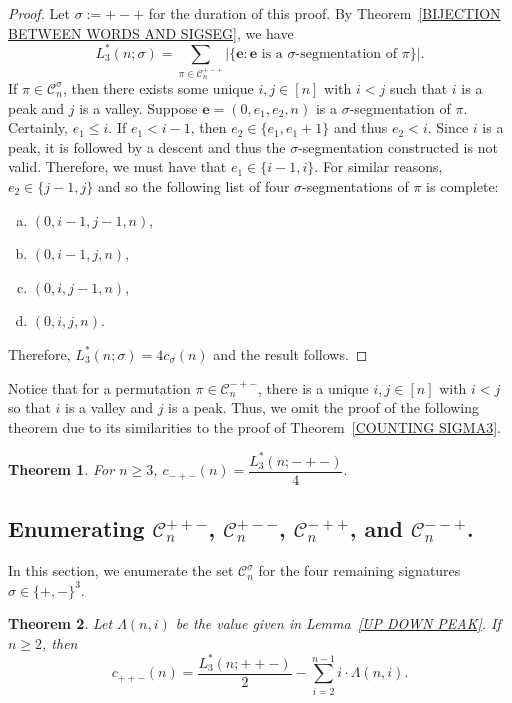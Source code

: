 \documentclass[12pt]{article}
\newcommand{\C}{\mathcal{C}}
\newcommand{\e}{\mathbf{e}}
\theoremstyle{plain}
\newtheorem{theorem}{Theorem}
\theoremstyle{definition}
\begin{document}
\begin{proof} Let $\sigma:=+-+$ for the duration of this proof.
By Theorem~\ref{BIJECTION BETWEEN WORDS AND SIGSEG}, we have
	\[L_3^*(n;\sigma)= \sum_{\pi \in \mathcal C_n^{+-+}} |\{\e: \e \text{ is a }\sigma\text{-segmentation of } \pi\}|.\]
If $\pi \in \mathcal C_n^{\sigma}$, then there exists some unique $i,j \in [n]$ with $i<j$ such that $i$ is a peak and $j$ is a valley.  Suppose $\e=(0, e_1, e_2, n)$ is a $\sigma$-segmentation of $\pi$. Certainly, $e_1\leq i$.  If $e_1<i-1$, then $e_2 \in \{e_1,e_1+1\}$ and thus $e_2<i$.  Since $i$ is a peak, it is followed by a descent and thus the $\sigma$-segmentation constructed is not valid. Therefore, we must have that $e_1\in\{i-1,i\}$. For similar reasons, $e_2 \in \{j-1,j\}$ and so the following list of four $\sigma$-segmentations of $\pi$ is complete:
	\begin{enumerate}[(a)]
		\item $(0, i-1, j-1, n)$,
		\item $(0, i-1, j, n)$,
		\item $(0, i, j-1, n)$,
		\item $(0, i, j, n)$.
	\end{enumerate} 
  Therefore, $L_3^*(n;\sigma)=4c_{\sigma}(n)$ and the result follows.
\end{proof}

Notice that for a permutation $\pi\in\C_n^{-+-}$, there is a unique $i,j \in [n]$ with $i<j$ so that $i$ is a valley and $j$ is a peak. 
Thus, we omit the proof of the following theorem due to its similarities to the proof of Theorem~\ref{COUNTING SIGMA3}.

\begin{theorem}\label{COUNTING SIGMA4}
For $n \geq 3$, $c_{-+-}(n)=\dfrac{L_3^*(n;-+-)}{4}.$
\end{theorem}




\subsection{Enumerating $\C_n^{++-}$, $\C_n^{+--}$, $\C_n^{-++}$, and $\C_n^{--+}$.}\label{SECTION 5678}


In this section, we enumerate the set $\mathcal C_n^{\sigma}$ for the four remaining signatures $\sigma\in\{+,-\}^3$. 
\begin{theorem}\label{COUNT SIGMA5}
Let $\Lambda(n,i)$ be the value given in Lemma~\ref{UP DOWN PEAK}. If $n\geq 2$, then
	\[c_{++-}(n)=\frac{L^*_3(n;++-)}{2}-\sum_{i=2}^{n-1}i\cdot\Lambda(n,i).\]
\end{theorem}
\end{document}
